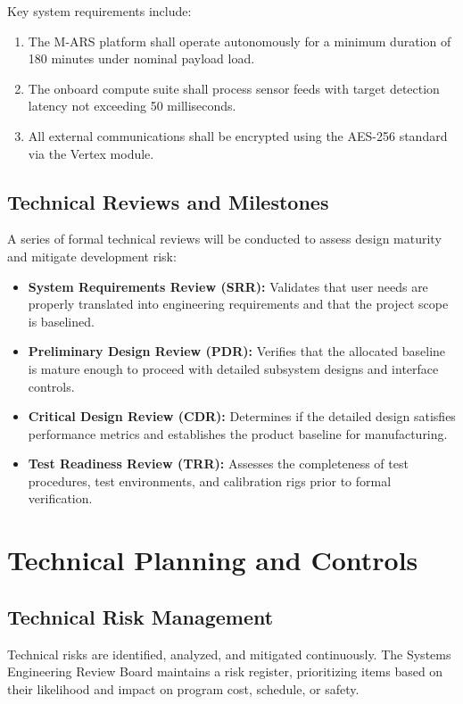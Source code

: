 \documentclass[10pt,letterpaper]{article}
\begin{document}
Key system requirements include:
\begin{enumerate}[label=\lbrack REQ-\arabic*\rbrack, noitemsep, topsep=3pt]
  \item The M-ARS platform shall operate autonomously for a minimum duration of 180 minutes under nominal payload load.
  \item The onboard compute suite shall process sensor feeds with target detection latency not exceeding 50 milliseconds.
  \item All external communications shall be encrypted using the AES-256 standard via the Vertex module.
\end{enumerate}

\subsection{Technical Reviews and Milestones}
A series of formal technical reviews will be conducted to assess design maturity and mitigate development risk:
\begin{itemize}[noitemsep, topsep=3pt]
  \item \textbf{System Requirements Review (SRR):} Validates that user needs are properly translated into engineering requirements and that the project scope is baselined.
  \item \textbf{Preliminary Design Review (PDR):} Verifies that the allocated baseline is mature enough to proceed with detailed subsystem designs and interface controls.
  \item \textbf{Critical Design Review (CDR):} Determines if the detailed design satisfies performance metrics and establishes the product baseline for manufacturing.
  \item \textbf{Test Readiness Review (TRR):} Assesses the completeness of test procedures, test environments, and calibration rigs prior to formal verification.
\end{itemize}

\section{Technical Planning and Controls}

\subsection{Technical Risk Management}
Technical risks are identified, analyzed, and mitigated continuously. The Systems Engineering Review Board maintains a risk register, prioritizing items based on their likelihood and impact on program cost, schedule, or safety.
\end{document}
